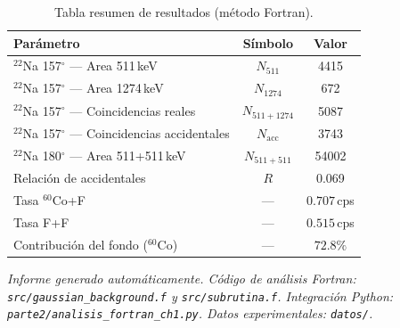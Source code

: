 \documentclass[12pt,a4paper]{article}
\begin{document}
\begin{table}[htbp]
\centering
\caption{Tabla resumen de resultados (m\'etodo Fortran).}
\label{tab:resumen_final}
\begin{tabular}{lcc}
\hline \hline
Par\'ametro & S\'imbolo & Valor \\
\hline
$^{22}$Na 157$^\circ$ --- Area 511\,keV & $N_{511}$ & 4415 \\
$^{22}$Na 157$^\circ$ --- Area 1274\,keV & $N_{1274}$ & 672 \\
$^{22}$Na 157$^\circ$ --- Coincidencias reales & $N_{511+1274}$ & 5087 \\
$^{22}$Na 157$^\circ$ --- Coincidencias accidentales & $N_{\text{acc}}$ & 3743 \\
$^{22}$Na 180$^\circ$ --- Area 511+511\,keV & $N_{511+511}$ & 54002 \\
Relaci\'on de accidentales & $R$ & 0.069 \\
Tasa $^{60}$Co+F & --- & $0.707$\,cps \\
Tasa F+F & --- & $0.515$\,cps \\
Contribuci\'on del fondo ($^{60}$Co) & --- & $72.8\%$ \\
\hline
\end{tabular}
\end{table}

\vfill
\noindent\small\textit{Informe generado autom\'aticamente. C\'odigo de an\'alisis Fortran: \texttt{src/gaussian\_background.f} y \texttt{src/subrutina.f}. Integraci\'on Python: \texttt{parte2/analisis\_fortran\_ch1.py}. Datos experimentales: \texttt{datos/}.}
\end{document}
